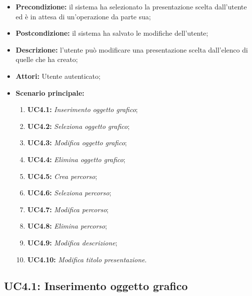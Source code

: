 \begin{itemize}
	\item \textbf{Precondizione:} il sistema ha selezionato la presentazione scelta dall'utente ed è in attesa di un'operazione da parte sua;
	\item \textbf{Postcondizione:} il sistema ha salvato le modifiche dell'utente;
	\item \textbf{Descrizione:} l'utente può modificare una presentazione scelta dall'elenco di quelle che ha creato;
	\item \textbf{Attori:} Utente autenticato;
	\item \textbf{Scenario principale:}
	\begin{enumerate}
		\item \textbf{ UC4.1:} \textit{ Inserimento oggetto grafico};
		\item \textbf{ UC4.2:} \textit{ Seleziona oggetto grafico};
		\item \textbf{ UC4.3:} \textit{ Modifica oggetto grafico};
		\item \textbf{ UC4.4:} \textit{ Elimina oggetto grafico};
		\item \textbf{ UC4.5:} \textit{ Crea percorso};
		\item \textbf{ UC4.6:} \textit{ Seleziona percorso};
		\item \textbf{ UC4.7:} \textit{ Modifica percorso};
		\item \textbf{ UC4.8:} \textit{ Elimina percorso};
		\item \textbf{ UC4.9:} \textit{ Modifica descrizione};
		\item \textbf{ UC4.10:} \textit{ Modifica titolo presentazione}.
	\end{enumerate}
\end{itemize}
\subsection{ UC4.1: Inserimento oggetto grafico}

